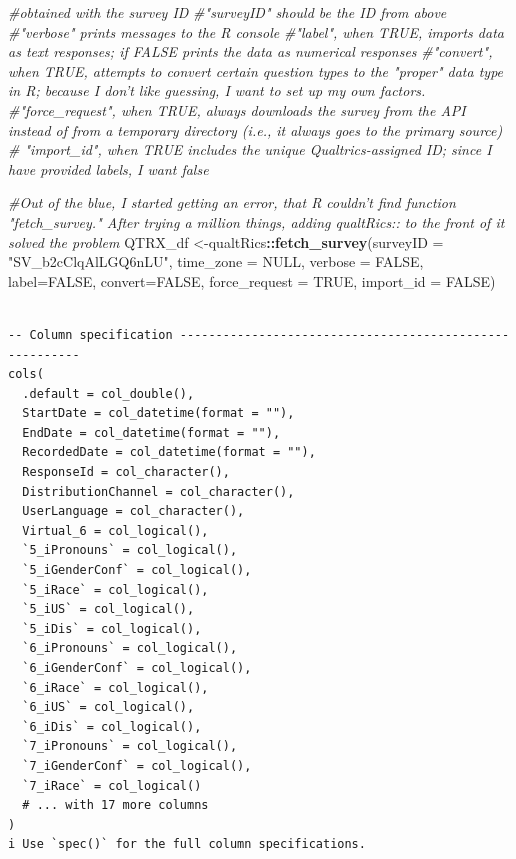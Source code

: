 \documentclass[
  english,
]{book}
\newenvironment{Shaded}{\begin{snugshade}}{\end{snugshade}}
\newcommand{\CommentTok}[1]{\textcolor[rgb]{0.56,0.35,0.01}{\textit{#1}}}
\newcommand{\DataTypeTok}[1]{\textcolor[rgb]{0.13,0.29,0.53}{#1}}
\newcommand{\KeywordTok}[1]{\textcolor[rgb]{0.13,0.29,0.53}{\textbf{#1}}}
\newcommand{\NormalTok}[1]{#1}
\newcommand{\OperatorTok}[1]{\textcolor[rgb]{0.81,0.36,0.00}{\textbf{#1}}}
\newcommand{\OtherTok}[1]{\textcolor[rgb]{0.56,0.35,0.01}{#1}}
\newcommand{\StringTok}[1]{\textcolor[rgb]{0.31,0.60,0.02}{#1}}
\begin{document}
\begin{Shaded}
\begin{Highlighting}[]
\CommentTok{#obtained with the survey ID }
\CommentTok{#"surveyID" should be the ID from above}
\CommentTok{#"verbose" prints messages to the R console}
\CommentTok{#"label", when TRUE, imports data as text responses; if FALSE prints the data as numerical responses}
\CommentTok{#"convert", when TRUE, attempts to convert certain question types to the "proper" data type in R; because I don't like guessing, I want to set up my own factors.}
\CommentTok{#"force_request", when TRUE, always downloads the survey from the API instead of from a temporary directory (i.e., it always goes to the primary source)}
\CommentTok{# "import_id", when TRUE includes the unique Qualtrics-assigned ID; since I have provided labels, I want false}

\CommentTok{#Out of the blue, I started getting an error, that R couldn't find function "fetch_survey."  After trying a million things, adding qualtRics:: to the front of it solved the problem}
\NormalTok{QTRX_df <-qualtRics}\OperatorTok{::}\KeywordTok{fetch_survey}\NormalTok{(}\DataTypeTok{surveyID =} \StringTok{"SV_b2cClqAlLGQ6nLU"}\NormalTok{, }\DataTypeTok{time_zone =} \OtherTok{NULL}\NormalTok{, }\DataTypeTok{verbose =} \OtherTok{FALSE}\NormalTok{, }\DataTypeTok{label=}\OtherTok{FALSE}\NormalTok{, }\DataTypeTok{convert=}\OtherTok{FALSE}\NormalTok{, }\DataTypeTok{force_request =} \OtherTok{TRUE}\NormalTok{, }\DataTypeTok{import_id =} \OtherTok{FALSE}\NormalTok{)}
\end{Highlighting}
\end{Shaded}

\begin{verbatim}

-- Column specification --------------------------------------------------------
cols(
  .default = col_double(),
  StartDate = col_datetime(format = ""),
  EndDate = col_datetime(format = ""),
  RecordedDate = col_datetime(format = ""),
  ResponseId = col_character(),
  DistributionChannel = col_character(),
  UserLanguage = col_character(),
  Virtual_6 = col_logical(),
  `5_iPronouns` = col_logical(),
  `5_iGenderConf` = col_logical(),
  `5_iRace` = col_logical(),
  `5_iUS` = col_logical(),
  `5_iDis` = col_logical(),
  `6_iPronouns` = col_logical(),
  `6_iGenderConf` = col_logical(),
  `6_iRace` = col_logical(),
  `6_iUS` = col_logical(),
  `6_iDis` = col_logical(),
  `7_iPronouns` = col_logical(),
  `7_iGenderConf` = col_logical(),
  `7_iRace` = col_logical()
  # ... with 17 more columns
)
i Use `spec()` for the full column specifications.
\end{verbatim}
\end{document}
